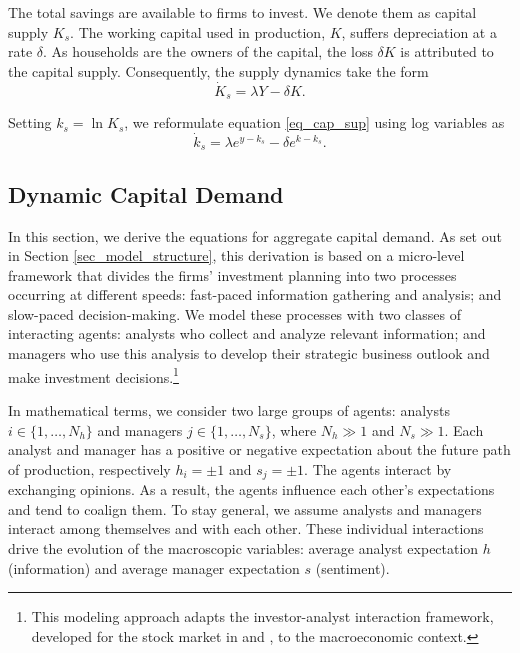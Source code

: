 \documentclass[authoryear, review]{elsarticle}
\begin{document}
The total savings are available to firms to invest. We denote them as capital supply $K_s$. The working capital used in production, $K$, suffers depreciation at a rate $\delta$. As households are the owners of the capital, the loss $\delta K$ is attributed to the capital supply. Consequently, the supply dynamics take the form 
\begin{equation}\label{eq_cap_sup}
    \dot{K}_s = \lambda Y - \delta K.
\end{equation}

Setting $k_s=\ln K_s$, we reformulate equation \eqref{eq_cap_sup} using log variables as
\begin{equation}\label{eq_ks_dot}
    \dot{k}_s = \lambda e^{y-k_s} - \delta e^{k-k_s}.
\end{equation} 

\subsection{Dynamic Capital Demand}\label{sec_model_demand}
In this section, we derive the equations for aggregate capital demand. As set out in Section \ref{sec_model_structure}, this derivation is based on a micro-level framework that divides the firms’ investment planning into two processes occurring at different speeds: fast-paced information gathering and analysis; and slow-paced decision-making. We model these processes %
with two classes of interacting agents: analysts who collect and analyze relevant information; and managers who use this analysis to develop their strategic business outlook and make investment decisions.\footnote{This modeling approach adapts the investor-analyst interaction framework, developed for the stock market in \citet{GusevEtAl2015} and \citet{KroujilineEtAl2016}, to the macroeconomic context.}

In mathematical terms, we consider two large groups of agents: analysts $i\in\{1,\dots,N_{h}\}$ and managers $j\in\{1,\ldots,N_{s}\}$, where $N_{h}\gg1$ and $N_{s}\gg1$. Each analyst and manager has a positive or negative expectation about the future path of production, respectively $h_{i}=\pm1$  and  $s_{j}=\pm1$. The agents interact by exchanging opinions. As a result, the agents influence each other's expectations and tend to coalign them. To stay general, we assume analysts and managers interact among themselves and with each other. These individual interactions drive the evolution of the macroscopic variables: average analyst expectation $h$ (information) and average manager expectation $s$ (sentiment). 
\end{document}
